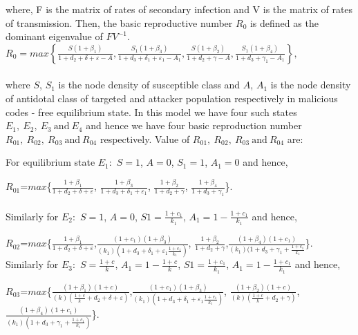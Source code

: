 \documentclass[conference]{IEEEtran}
\begin{document}
where, F is the matrix of rates of secondary infection and V is the matrix of rates of transmission. Then, the basic reproductive number $R_0$ is defined as the dominant eigenvalue of $FV^{-1}$. \\
\begingroup
\everymath{\scriptstyle}
\scriptsize
$R_0 = max\left\{\frac{S(1+{\beta}_1)}{1+d_2+\delta+\varepsilon-A},\frac{S_1(1+{\beta}_3)}{1+d_3+{\delta}_1+{\varepsilon}_1-A_1},
\frac{S(1+{\beta}_2)}{1+d_2+\gamma-A},\frac{S_1(1+{\beta}_4)}{1+d_3+{\gamma}_1-A_1}\right\},$ \\
\endgroup \\
\noindent where $S$, $S_1$ is the node density of susceptible class and $A$, $A_1$ is the node density of antidotal class of targeted and attacker population respectively in malicious codes - free equilibrium state. In this model we have four such states $E_1, \ E_2, \ E_3  \ \mbox{and} \ E_4$ and hence we have four basic reproduction number $R_{01}, \ R_{02}, \ R_{03}  \ \mbox{and} \ R_{04}$ respectively.
Value of $R_{01}, \ R_{02}, \ R_{03} \ \mbox{and} \ R_{04}$ are:

\noindent For equilibrium state $E_1:$
$S=1$, $A=0$, $S_1=1$, $A_1=0$ and hence,

\begingroup
\everymath{\scriptstyle}
\scriptsize
$R_{01}$=$max$\{$\frac{1+{\beta}_1}{1+d_2+\delta+\varepsilon}$, $\frac{1+{\beta}_3}{1+d_3+{\delta}_1+{\varepsilon}_1}$, $\frac{1+{\beta}_2}{1+d_2+\gamma}$, $\frac{1+{\beta}_4}{1+d_3+{\gamma}_1}$\}.\\
\endgroup \\
\noindent Similarly for $E_2:$ $S=1$, $A=0$, $S1=\frac{1+c_1}{k_1}$, $A_1=1-\frac{1+c_1}{k_1}$ and hence,

$R_{02}$=$max$\{$\frac{1+{\beta}_1}{1+d_2+\delta+\varepsilon}$,$\frac{(1+c_1)(1+{\beta}_3)}{(k_1)(1+d_3+{\delta}_1+{\varepsilon}_1\frac{1+c_1}{k_1})}$,
$\frac{1+{\beta}_2}{1+d_2+\gamma}$,$\frac{(1+{\beta}_4)(1+c_1)}{(k_1)(1+d_3+{\gamma}_1+\frac{1+c_1}{k_1}}$\}.\\

\noindent Similarly for $E_3:$ $S=\frac{1+c}{k}$, $A_1=1-\frac{1+c}{k}$, $S1=\frac{1+c_1}{k_1}$, $A_1=1-\frac{1+c_1}{k_1}$ and hence,

$R_{03}$=$max$\{$\frac{(1+{\beta}_1)(1+c)}{(k)(\frac{1+c}{k}+d_2+\delta+\varepsilon)}$,$\frac{(1+c_1)(1+{\beta}_3)}{(k_1)(1+d_3+{\delta}_1+{\varepsilon}_1\frac{1+c_1}{k_1})}$,
$\frac{(1+{\beta}_2)(1+c)}{(k)(\frac{1+c}{k}+d_2+\gamma)}$,$\frac{(1+{\beta}_4)(1+c_1)}{(k_1)(1+d_3+{\gamma}_1+\frac{1+c_1}{k_1})}$\}.\\
\end{document}

